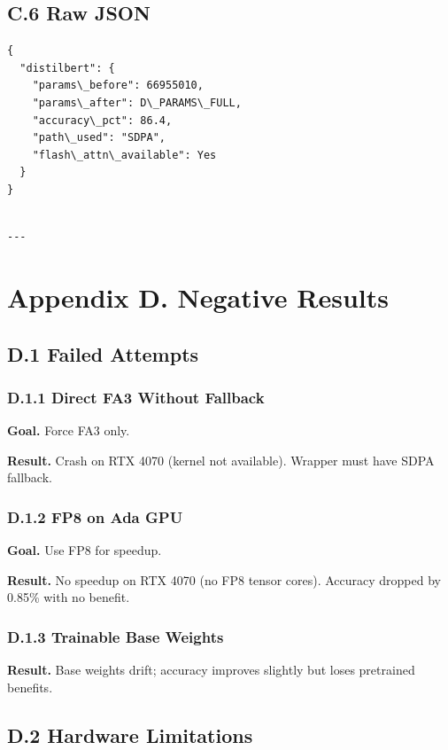 \subsection{C.6 Raw JSON}

\begin{lstlisting}
{
  "distilbert": {
    "params\_before": 66955010,
    "params\_after": D\_PARAMS\_FULL,
    "accuracy\_pct": 86.4,
    "path\_used": "SDPA",
    "flash\_attn\_available": Yes
  }
}
\end{lstlisting}
\begin{lstlisting}

---
\end{lstlisting}

\section{Appendix D. Negative Results}

\subsection{D.1 Failed Attempts}

\subsubsection{D.1.1 Direct FA3 Without Fallback}

\textbf{Goal.} Force FA3 only.

\textbf{Result.} Crash on RTX 4070 (kernel not available). Wrapper must 
have SDPA fallback.

\subsubsection{D.1.2 FP8 on Ada GPU}

\textbf{Goal.} Use FP8 for speedup.

\textbf{Result.} No speedup on RTX 4070 (no FP8 tensor cores). Accuracy dropped 
by 0.85\% with no benefit.

\subsubsection{D.1.3 Trainable Base Weights}

\textbf{Result.} Base weights drift; accuracy improves slightly but loses 
pretrained benefits.

\subsection{D.2 Hardware Limitations}

